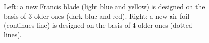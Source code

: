 \begin{figure}[h!]
\begin{minipage}[b]{0.5\linewidth}
 \centering
\end{minipage}
\begin{minipage}[b]{0.5\linewidth}
 \centering
\end{minipage}
\caption{Left: a new Francis blade (light blue and yellow) is designed on the basis of 3 older ones (dark blue and red). Right: a new air-foil (continues line) is designed on the basis of 4 older ones (dotted lines).} 
\label{CBRtemp}
\end{figure}

